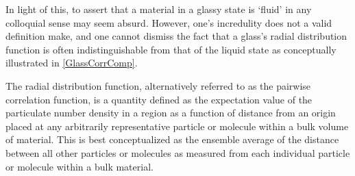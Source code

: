 In light of this, to assert that a material in a glassy state is `fluid' in any colloquial sense may seem absurd. However, one's incredulity does not a valid definition make, and one cannot dismiss the fact that a glass's radial distribution function is often indistinguishable from that of the liquid state as conceptually illustrated in \fig \nolinebreak \ref{GlassCorrComp}.

The radial distribution function, alternatively referred to as the pairwise correlation function, is a quantity defined as the expectation value of the particulate number density in a region as a function of distance from an origin placed at any arbitrarily representative particle or molecule within a bulk volume of material.  This is best conceptualized as the ensemble average of the distance between all other particles or molecules as measured from each individual particle or molecule within a bulk material.

